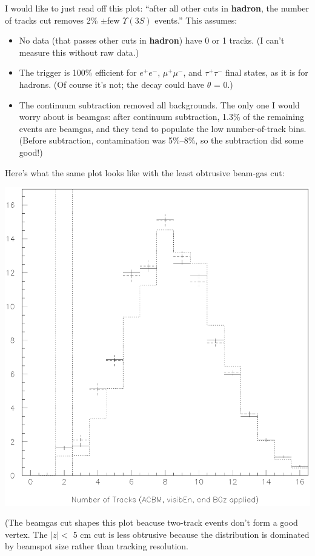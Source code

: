 \documentclass{article}
\begin{document}
\pagebreak
I would like to just read off this plot: ``after all other cuts in
{\bf hadron}, the number of tracks cut removes 2\% $\pm$few
$\Upsilon(3S)$ events.''  This assumes:
\begin{itemize}

  \item No data (that passes other cuts in {\bf hadron}) have 0 or 1
  tracks.  (I can't measure this without raw data.)

  \item The trigger is 100\% efficient for $e^+e^-$, $\mu^+\mu^-$, and
  $\tau^+\tau^-$ final states, as it is for hadrons.  (Of course it's
  not; the decay could have $\theta$ = 0.)

  \item The continuum subtraction removed all backgrounds.  The only
  one I would worry about is beamgas: after continuum subtraction,
  1.3\% of the remaining events are beamgas, and they tend to populate
  the low number-of-track bins.  (Before subtraction, contamination
  was 5\%--8\%, so the subtraction did some good!)

\end{itemize}
Here's what the same plot looks like with the least obtrusive beam-gas
cut:
\begin{center}
  \vspace{-1 cm}
  \includegraphics[width=0.8\linewidth]{ntracks_bgcut.eps}
\end{center}
(The beamgas cut shapes this plot beacuse two-track events don't form
a good vertex.  The $|z| <$ 5 cm cut is less obtrusive because the
distribution is dominated by beamspot size rather than tracking
resolution.
\end{document}
